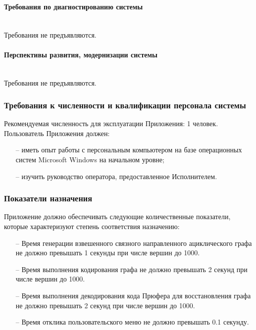 \documentclass[12pt,a4paper]{article}
\begin{document}
\paragraph{Требования по диагностированию системы}\mbox{}\medskip\\
Требования не предъявляются.

\paragraph{Перспективы развития, модернизации системы}\mbox{}\medskip\\
Требования не предъявляются.

\subsubsection{Требования к численности и квалификации персонала системы}\label{412}
Рекомендуемая численность для эксплуатации Приложения: 1 человек. \\

\noindent Пользователь Приложения должен:
\begin{itemize}
    \item[--] иметь опыт работы с персональным компьютером на базе операционных систем Microsoft Windows на начальном уровне;
    \item[--] изучить руководство оператора, предоставленное Исполнителем.
\end{itemize}

\subsubsection{Показатели назначения}
Приложение должно обеспечивать следующие количественные показатели, которые характеризуют степень соответствия назначению:
\begin{itemize}
    \item[--] Время генерации взвешенного связного направленного ациклического графа не должно превышать 1 секунды
    при числе вершин до 1000.
    \item[--] Время выполнения кодирования графа не должно превышать 2 секунд при числе вершин до 1000.
    \item[--] Время выполнения декодирования кода Прюфера для восстановления графа не должно превышать 2 секунд 
    при числе вершин до 1000.
    \item[--] Время отклика пользовательского меню не должно превышать 0.1 секунду.
\end{itemize}
\end{document}
